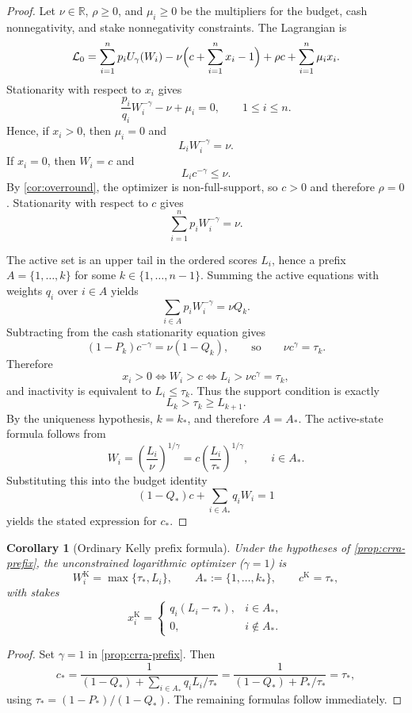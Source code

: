 \documentclass[11pt]{article}
\newtheorem{corollary}[theorem]{Corollary}
\theoremstyle{definition}
\theoremstyle{remark}
\newcommand{\R}{\mathbb{R}}
\newcommand{\1}{\mathbf{1}}
\begin{document}
\begin{proof}
Let $\nu\in\R$, $\rho\ge 0$, and $\mu_i\ge 0$ be the multipliers for the budget, cash nonnegativity, and stake nonnegativity constraints. The Lagrangian is
\[
\mathcal L_0
=
\sum_{i=1}^n p_iU_\gamma(W_i)
-\nu\Bigl(c+\sum_{i=1}^n x_i-1\Bigr)
+\rho c+\sum_{i=1}^n \mu_i x_i.
\]
Stationarity with respect to $x_i$ gives
\[
\frac{p_i}{q_i}W_i^{-\gamma}-\nu+\mu_i=0,
\qquad 1\le i\le n.
\]
Hence, if $x_i>0$, then $\mu_i=0$ and
\[
L_iW_i^{-\gamma}=\nu.
\]
If $x_i=0$, then $W_i=c$ and
\[
L_ic^{-\gamma}\le \nu.
\]
By \cref{cor:overround}, the optimizer is non-full-support, so $c>0$ and therefore $\rho=0$. Stationarity with respect to $c$ gives
\[
\sum_{i=1}^n p_iW_i^{-\gamma}=\nu.
\]

The active set is an upper tail in the ordered scores $L_i$, hence a prefix $A=\{1,\dots,k\}$ for some $k\in\{1,\dots,n-1\}$. Summing the active equations with weights $q_i$ over $i\in A$ yields
\[
\sum_{i\in A}p_iW_i^{-\gamma}=\nu Q_k.
\]
Subtracting from the cash stationarity equation gives
\[
(1-P_k)c^{-\gamma}=\nu(1-Q_k),
\qquad\text{so}\qquad
\nu c^{\gamma}=\tau_k.
\]
Therefore
\[
x_i>0 \iff W_i>c \iff L_i>\nu c^\gamma=\tau_k,
\]
and inactivity is equivalent to $L_i\le \tau_k$. Thus the support condition is exactly
\[
L_k>\tau_k\ge L_{k+1}.
\]
By the uniqueness hypothesis, $k=k_*$, and therefore $A=A_*$. The active-state formula follows from
\[
W_i=\left(\frac{L_i}{\nu}\right)^{1/\gamma}
=c\left(\frac{L_i}{\tau_*}\right)^{1/\gamma},
\qquad i\in A_*.
\]
Substituting this into the budget identity
\[
(1-Q_*)c+\sum_{i\in A_*}q_iW_i=1
\]
yields the stated expression for $c_*$.
\end{proof}

\begin{corollary}[Ordinary Kelly prefix formula]
\label{cor:log-prefix}
Under the hypotheses of \cref{prop:crra-prefix}, the unconstrained logarithmic optimizer ($\gamma=1$) is
\[
W_i^{\mathrm K}=\max\{\tau_*,L_i\},
\qquad
A_*:=\{1,\dots,k_*\},
\qquad
c^{\mathrm K}=\tau_*,
\]
with stakes
\[
x_i^{\mathrm K}=
\begin{cases}
q_i(L_i-\tau_*), & i\in A_*,\\
0, & i\notin A_*.
\end{cases}
\]
\end{corollary}

\begin{proof}
Set $\gamma=1$ in \cref{prop:crra-prefix}. Then
\[
c_*=
\frac{1}{(1-Q_*)+\sum_{i\in A_*}q_iL_i/\tau_*}
=
\frac{1}{(1-Q_*)+P_*/\tau_*}
=\tau_*,
\]
using $\tau_*=(1-P_*)/(1-Q_*)$. The remaining formulas follow immediately.
\end{proof}
\end{document}
